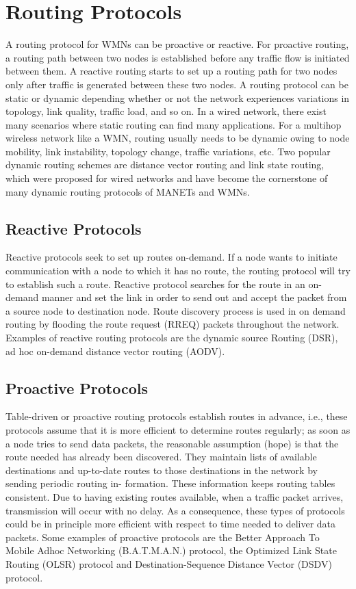 \documentclass[12pt,a4paper]{report}
\begin{document}
\section{Routing Protocols}
A routing protocol for WMNs can be proactive or reactive. For proactive routing, a routing
path between two nodes is established before any traffic flow is initiated between them. A
reactive routing starts to set up a routing path for two nodes only after traffic is generated
between these two nodes.
A routing protocol can be static or dynamic depending whether or not the network
experiences variations in topology, link quality, traffic load, and so on. In a wired network,
there exist many scenarios where static routing can find many applications. For a multihop
wireless network like a WMN, routing usually needs to be dynamic owing to node mobility,
link instability, topology change, traffic variations, etc. Two popular dynamic routing
schemes are distance vector routing and link state routing, which were proposed for
wired networks and have become the cornerstone of many dynamic routing protocols of
MANETs and WMNs.

\subsection{Reactive Protocols}
Reactive protocols seek to set up routes on-demand. If a node wants to initiate communication with a node to which it has no route, the routing protocol will try to establish such a route.
Reactive protocol searches for the route in an on-demand 
manner and set the link in order to send out and accept the 
packet from a source node to destination node. Route 
discovery process is used in on demand routing by flooding 
the route request (RREQ) packets throughout the network.
Examples of reactive routing protocols are the dynamic 
source Routing (DSR), ad hoc on-demand distance vector 
routing (AODV).


\subsection{Proactive Protocols}
Table-driven or proactive routing protocols establish routes in advance, i.e., these
protocols assume that it is more efficient to determine routes regularly; as soon as a
node tries to send data packets, the reasonable assumption (hope) is that the route
needed has already been discovered. They maintain lists of available destinations and
up-to-date routes to those destinations in the network by sending periodic routing in-
formation. These information keeps routing tables consistent. Due to having existing
routes available, when a traffic packet arrives, transmission will occur with no delay.
As a consequence, these types of protocols could be in principle more efficient with
respect to time needed to deliver data packets. Some examples of proactive protocols
are the Better Approach To Mobile Adhoc Networking (B.A.T.M.A.N.) protocol, the
Optimized Link State Routing (OLSR) protocol and Destination-Sequence Distance
Vector (DSDV) protocol.
\end{document}
